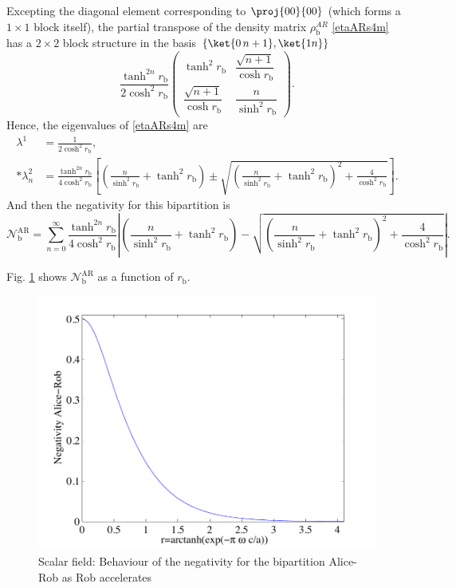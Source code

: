 Excepting the diagonal element corresponding to $\proj{00}{00}$ (which forms a $1\times1$ block itself), the partial transpose of the density matrix $\rho^{A R}_\text{b} $ \eqref{etaARs4m} has a $2\times2$ block structure in the basis $\{ \ket{0\, n+1},\ket{1 n}\}$
\begin{equation}\label{blocks}
\frac{\tanh^{2n}r_\text{b}}{2\cosh^2 r_\text{b}}
\left(\!\begin{array}{cc}
\tanh^2 r_\text{b} & \dfrac{\sqrt{n+1}}{\cosh r_\text{b}}\\
\dfrac{\sqrt{n+1}}{\cosh r_\text{b}} & \dfrac{n}{\sinh^2r_\text{b}}
\end{array}\!\right).
\end{equation}
Hence, the eigenvalues of \eqref{etaARs4m} are
\begin{align}
\nonumber\lambda^1&=\frac{1}{2\cosh^2r_\text{b}},\\*
\lambda^2_n&=\frac{\tanh^{2n} r_\text{b}}{4\cosh^2 r_\text{b}}\left[\left(\frac{n}{\sinh^2r_\text{b}}+\tanh^2 r_\text{b}\right)\pm\sqrt{\left(\frac{n}{\sinh^2r_\text{b}}+\tanh^2 r_\text{b}\right)^2+\frac{4}{\cosh^2 r_\text{b}}}\right].
\end{align}
And then the negativity for this bipartition is
\begin{equation}
\mathcal{N}^\text{AR}_\text{b}\!=\!\sum_{n=0}^\infty\frac{\tanh^{2n} r_\text{b}}{4\cosh^2 r_\text{b}}\left|\!\left(\frac{n}{\sinh^2r_\text{b}}+\tanh^2 r_\text{b}\right)\!-\sqrt{\left(\frac{n}{\sinh^2r_\text{b}}+\tanh^2 r_\text{b}\right)^2\!\!+\frac{4}{\cosh^2 r_\text{b}}}\right|.
\end{equation}

Fig. \ref{negARbosfig} shows $\mathcal{N}^\text{AR}_\text{b}$ as a function of $r_\text{b}$.

\begin{figure}[h]
\begin{center}
\includegraphics[width=.85\textwidth]{negARbos}
\end{center}
\caption{ Scalar field: Behaviour of the negativity for the bipartition Alice-Rob as Rob accelerates}
\label{negARbosfig}
\end{figure}

